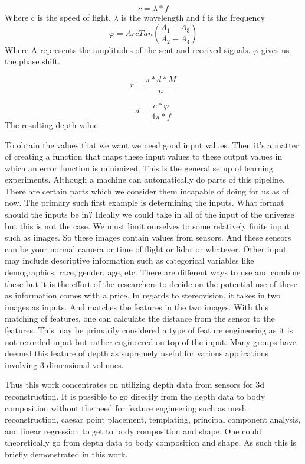 \begin{equation}
c = \lambda * f
\end{equation}
Where c is the speed of light, $\lambda$ is the wavelength and f is the frequency
\begin{equation}
	\varphi = ArcTan(\frac{A_1 - A_3}{A_2 - A_4})
\end{equation}
Where A represents the amplitudes of the sent and received signals. $\varphi$ gives us the phase shift.

\begin{equation}
	r = \frac{\pi * d * M}{n}
\end{equation}

\begin{equation}
	d = \frac{c * \varphi}{4\pi * f}
\end{equation}
The resulting depth value.

To obtain the values that we want we need good input values. Then it's a matter of creating a function that maps these input values to these output values in which an error function is minimized. 
This is the general setup of learning experiments. Although a machine can automatically do parts of this pipeline. There are certain parts which we consider them incapable of doing for us as of now. The primary such first example is determining the inputs. What format should the inputs be in? Ideally we could take in all of the input of the universe but this is not the case. We must limit ourselves to some relatively finite input such as images. So these images contain values from sensors. And these sensors can be your normal camera or time of flight or lidar or whatever. Other input may include descriptive information such as categorical variables like demographics: race, gender, age, etc. There are different ways to use and combine these but it is the effort of the researchers to decide on the potential use of these as information comes with a price. In regards to stereovision, it takes in two images as inputs. And matches the features in the two images. With this matching of features, one can calculate the distance from the sensor to the features. This may be primarily considered a type of feature engineering as it is not recorded input but rather engineered on top of the input. Many groups have deemed this feature of depth as supremely useful for various applications involving 3 dimensional volumes.

Thus this work concentrates on utilizing depth data from sensors for 3d reconstruction. It is possible to go directly from the depth data to body composition without the need for feature engineering such as mesh reconstruction, caesar point placement, templating, principal component analysis, and linear regression to get to body composition and shape. One could theoretically go from depth data to body composition and shape. As such this is briefly demonstrated in this work.

